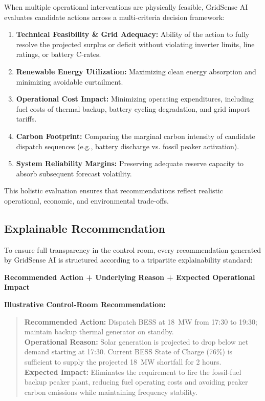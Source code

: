 When multiple operational interventions are physically feasible, GridSense AI evaluates candidate actions across a multi-criteria decision framework:
\begin{enumerate}[leftmargin=1.8em, itemsep=0.25em]
    \item \textbf{Technical Feasibility \& Grid Adequacy:} Ability of the action to fully resolve the projected surplus or deficit without violating inverter limits, line ratings, or battery C-rates.
    \item \textbf{Renewable Energy Utilization:} Maximizing clean energy absorption and minimizing avoidable curtailment.
    \item \textbf{Operational Cost Impact:} Minimizing operating expenditures, including fuel costs of thermal backup, battery cycling degradation, and grid import tariffs.
    \item \textbf{Carbon Footprint:} Comparing the marginal carbon intensity of candidate dispatch sequences (e.g., battery discharge vs. fossil peaker activation).
    \item \textbf{System Reliability Margins:} Preserving adequate reserve capacity to absorb subsequent forecast volatility.
\end{enumerate}

This holistic evaluation ensures that recommendations reflect realistic operational, economic, and environmental trade-offs.

\subsection{Explainable Recommendation}
\label{subsec:explainable_recommendations}

To ensure full transparency in the control room, every recommendation generated by GridSense AI is structured according to a tripartite explainability standard:
\begin{center}
    \textbf{\color{primaryNavy}Recommended Action \quad + \quad Underlying Reason \quad + \quad Expected Operational Impact}
\end{center}

\noindent\textbf{Illustrative Control-Room Recommendation:}
\begin{quote}
    \small
    \textbf{Recommended Action:} Dispatch BESS at 18~MW from 17:30 to 19:30; maintain backup thermal generator on standby.\\
    \textbf{Operational Reason:} Solar generation is projected to drop below net demand starting at 17:30. Current BESS State of Charge (76\%) is sufficient to supply the projected 18~MW shortfall for 2 hours.\\
    \textbf{Expected Impact:} Eliminates the requirement to fire the fossil-fuel backup peaker plant, reducing fuel operating costs and avoiding peaker carbon emissions while maintaining frequency stability.
\end{quote}

